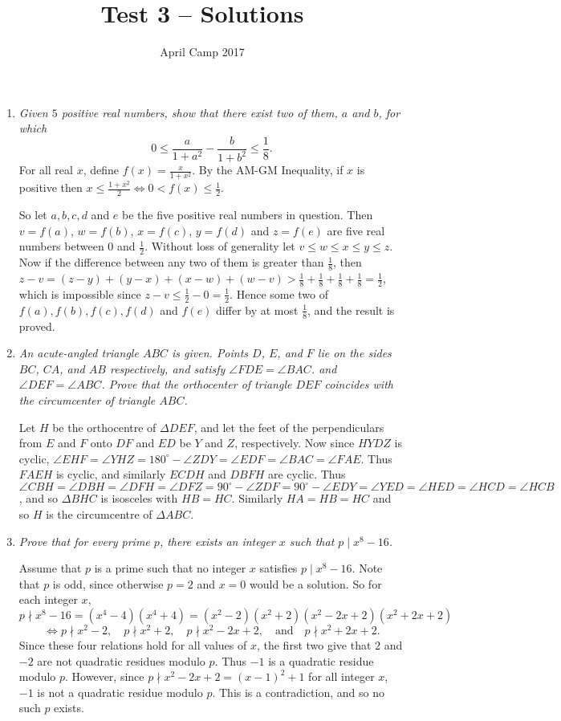 \documentclass[a4paper,12pt]{article}
\author{April Camp 2017}
\title{Test 3 -- Solutions}
\date{}
\begin{document}
 \maketitle

\begin{enumerate}
	\item 
	\textit{Given $5$ positive real numbers, show that there exist two of them,
	$a$ and $b$, for which \[0 \leq \frac{a}{1+a^2} - \frac{b}{1+b^2} \leq \frac{1}{8}.\]}
	For all real $x$, define $f(x) = \frac{x}{1+x^2}$. By the AM-GM Inequality, if $x$ is positive then $x \leq \frac{1+x^2}{2} \iff 0 < f(x) \leq \frac{1}{2}$.
	
	So let $a,b,c,d$ and $e$ be the five positive real numbers in question. Then $v=f(a)$, $w=f(b)$, $x=f(c)$, $y=f(d)$ and $z=f(e)$ are five real numbers between $0$ and $\frac{1}{2}$. Without loss of generality let $v\leq w\leq x\leq y\leq z$. Now if the difference between any two of them is greater than $\frac{1}{8}$, then $z-v = (z-y) + (y-x) + (x-w) + (w-v) > \frac{1}{8}+\frac{1}{8}+\frac{1}{8}+\frac{1}{8} = \frac{1}{2}$, which is impossible since $z-v \leq \frac{1}{2}-0 = \frac{1}{2}$. Hence some two of $f(a), f(b), f(c), f(d)$ and $f(e)$ differ by at most $\frac{1}{8}$, and the result is proved.
	
	\item 
	\textit{An acute-angled triangle $ABC$ is given. Points $D$, $E$, and $F$ lie
	on the sides $BC$, $CA$, and $AB$ respectively, and satisfy $\angle
	FDE = \angle BAC$. and $\angle DEF = \angle ABC$. Prove that the
	orthocenter of triangle $DEF$ coincides with the circumcenter of
	triangle $ABC$.}
	
	Let $H$ be the orthocentre of $\Delta DEF$, and let the feet of the perpendiculars from $E$ and $F$ onto $DF$ and $ED$ be $Y$ and $Z$, respectively. Now since $HYDZ$ is cyclic, $\angle EHF = \angle YHZ = 180^\circ - \angle ZDY = \angle EDF = \angle BAC = \angle FAE$. Thus $FAEH$ is cyclic, and similarly $ECDH$ and $DBFH$ are cyclic. Thus $\angle CBH = \angle DBH = \angle DFH = \angle DFZ = 90^\circ - \angle ZDF = 90^\circ - \angle EDY = \angle YED = \angle HED = \angle HCD = \angle HCB$, and so $\Delta BHC$ is isosceles with $HB=HC$. Similarly $HA=HB=HC$ and so $H$ is the circumcentre of $\Delta ABC$.
	
	\item
	\textit{Prove that for every prime $p$, there exists an integer $x$ such that $p\mid x^8-16$.}
	
	Assume that $p$ is a prime such that no integer $x$ satisfies $p \mid x^8-16$. Note that $p$ is odd, since otherwise $p=2$ and $x=0$ would be a solution. So for each integer $x$, \[p \nmid x^8-16 = (x^4-4)(x^4+4) = (x^2-2)(x^2+2) (x^2-2x+2)(x^2+2x+2)\] \[\iff p \nmid x^2-2,\quad p \nmid x^2+2,\quad p \nmid x^2-2x+2,\quad \text{and} \quad p \nmid x^2+2x+2.\]
	Since these four relations hold for all values of $x$, the first two give that $2$ and $-2$ are not quadratic residues modulo $p$. Thus $-1$ is a quadratic residue modulo $p$. However, since $p \nmid x^2-2x+2 = (x-1)^2+1$ for all integer $x$, $-1$ is not a quadratic residue modulo $p$. This is a contradiction, and so no such $p$ exists.
	

\end{enumerate}
\end{document}
